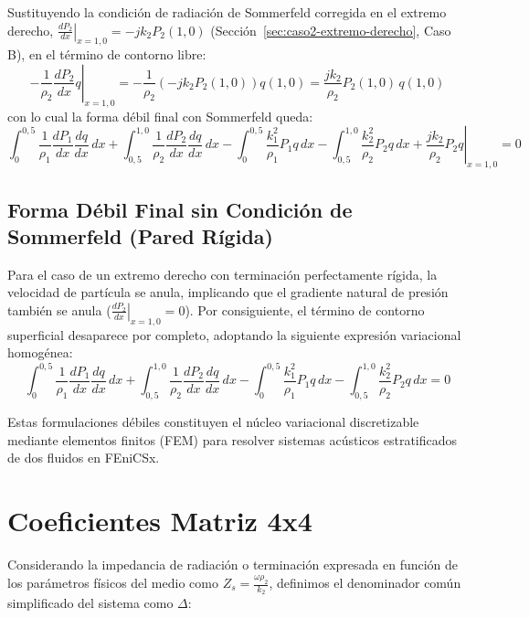 \documentclass[11pt,letterpaper]{article}
\begin{document}
Sustituyendo la condición de radiación de Sommerfeld corregida en el extremo derecho, $\left.\frac{dP_2}{dx}\right|_{x=1{,}0} = -j k_2 P_2(1{,}0)$ (Sección~\ref{sec:caso2-extremo-derecho}, Caso B), en el término de contorno libre:
\begin{equation}
    -\left. \frac{1}{\rho_2} \frac{dP_2}{dx} q \right|_{x=1{,}0} = -\frac{1}{\rho_2}\left(-jk_2 P_2(1{,}0)\right) q(1{,}0) = \frac{j k_2}{\rho_2} P_2(1{,}0)\, q(1{,}0)
\end{equation}
con lo cual la forma débil final con Sommerfeld queda:
\begin{equation}
    \int_0^{0{,}5} \frac{1}{\rho_1} \frac{dP_1}{dx} \frac{dq}{dx} \, dx + \int_{0{,}5}^{1{,}0} \frac{1}{\rho_2} \frac{dP_2}{dx} \frac{dq}{dx} \, dx - \int_0^{0{,}5} \frac{k_1^2}{\rho_1} P_1 q \, dx - \int_{0{,}5}^{1{,}0} \frac{k_2^2}{\rho_2} P_2 q \, dx + \left. \frac{j k_2}{\rho_2} P_2 q \right|_{x=1{,}0} = 0
\end{equation}

\subsection{Forma Débil Final sin Condición de Sommerfeld (Pared Rígida)}

Para el caso de un extremo derecho con terminación perfectamente rígida, la velocidad de partícula se anula, implicando que el gradiente natural de presión también se anula ($\left.\frac{dP_2}{dx}\right|_{x=1{,}0} = 0$). Por consiguiente, el término de contorno superficial desaparece por completo, adoptando la siguiente expresión variacional homogénea:
\begin{equation}
    \int_0^{0{,}5} \frac{1}{\rho_1} \frac{dP_1}{dx} \frac{dq}{dx} \, dx + \int_{0{,}5}^{1{,}0} \frac{1}{\rho_2} \frac{dP_2}{dx} \frac{dq}{dx} \, dx - \int_0^{0{,}5} \frac{k_1^2}{\rho_1} P_1 q \, dx - \int_{0{,}5}^{1{,}0} \frac{k_2^2}{\rho_2} P_2 q \, dx = 0
\end{equation}

Estas formulaciones débiles constituyen el núcleo variacional discretizable mediante elementos finitos (FEM) para resolver sistemas acústicos estratificados de dos fluidos en FEniCSx.

\section{Coeficientes Matriz 4x4}

Considerando la impedancia de radiación o terminación expresada en función de los parámetros físicos del medio como $Z_s = \frac{\omega \rho_2}{k_2}$, definimos el denominador común simplificado del sistema como $\Delta$:
\end{document}
